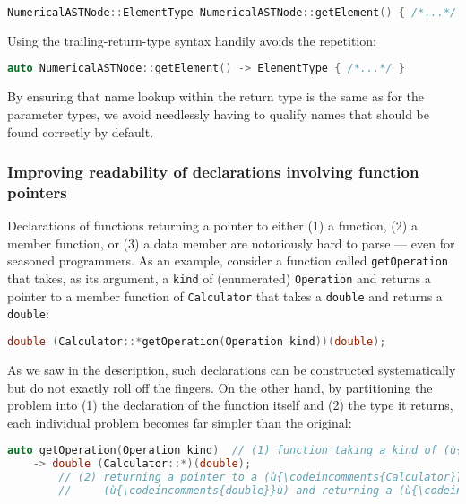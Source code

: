 \begin{lstlisting}[language=C++]
NumericalASTNode::ElementType NumericalASTNode::getElement() { /*...*/ }
\end{lstlisting}
    
\noindent Using the trailing-return-type syntax handily avoids the repetition:

\begin{lstlisting}[language=C++]
auto NumericalASTNode::getElement() -> ElementType { /*...*/ }
\end{lstlisting}
    
\noindent By ensuring that name lookup within the return type is the same as for
the parameter types, we avoid needlessly having to qualify names that
should be found correctly by default.

\subsubsection[Improving readability of declarations involving function pointers]{Improving readability of declarations involving function pointers}\label{improving-readability-of-declarations-involving-function-pointers}

Declarations of functions returning a pointer to either (1) a function, (2) a member function, or (3) a data member are notoriously hard to parse --- even for seasoned programmers. As an example, consider a function called
\texttt{getOperation} that takes, as its argument, a \texttt{kind} of
(enumerated) \texttt{Operation} and returns a pointer to a member
function of \texttt{Calculator} that takes a \texttt{double} and
returns a \texttt{double}:

\begin{lstlisting}[language=C++]
double (Calculator::*getOperation(Operation kind))(double);
\end{lstlisting}
    
\noindent As we saw in the description, such declarations can be constructed
systematically but do not exactly roll off the fingers. On the other
hand, by partitioning the problem into (1) the declaration of the
function itself and (2) the type it returns, each individual problem
becomes far simpler than the original:

\begin{lstlisting}[language=C++]
auto getOperation(Operation kind)  // (1) function taking a kind of (ù{\codeincomments{Operation}}ù)
    -> double (Calculator::*)(double);  
        // (2) returning a pointer to a (ù{\codeincomments{Calculator}}ù) member function taking a 
        //     (ù{\codeincomments{double}}ù) and returning a (ù{\codeincomments{double}}ù)                                        
\end{lstlisting}
    
